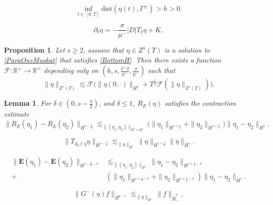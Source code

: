 \documentclass[10pt,a4paper]{amsart}
\newtheorem{proposition}{Proposition}
\newtheorem{lemma}{Lemma}
\newcommand{\R}{\mathbb{R}}
\newcommand{\f}{\frac}
\newcommand{\p}{\partial}
\begin{document}
\begin{equation} \label{BottomH}
 \inf_{t\in[0,T]}\text{dist}(\eta(t), \Gamma^\pm)> h>0.
\end{equation}

\begin{equation} \label{ParaOneMuskat}
 \p_t \eta = -\frac{\sigma}{\mu^{-}} |D|T_\ell \eta + K, 
\end{equation}

\begin{proposition} \label{t:OnePhaseEst}
Let $s\geq2$, assume that $\eta \in Z^s(T)$ is a solution to \eqref{ParaOneMuskat} that satisfies \eqref{BottomH}.
Then there exists a function $\mathcal{F}: \R^+ \rightarrow \R^+$ depending only on $(h,s,\frac{\rho^- g}{\mu^-},\frac{\sigma}{\mu^-})$ such that
\begin{equation} \label{OneAprioriEst}
  \| \eta\|_{Z^s(T)} \lesssim \mathcal{F}\big(\|\eta(0,\cdot)\|_{H^s} + T^\f12\mathcal{F}( \| \eta\|_{Z^s(T)})\big).
\end{equation}
\end{proposition}

\begin{lemma} \label{t:REEst}
For $\delta\in (0,s- \f32)$, and $\delta \leq 1$, $R_E(\eta)$ satisfies the contraction estimate
\begin{equation*}
 \|R_E(\eta_1) - R_E(\eta_2) \|_{H^{s-\f32}} \lesssim_{\|(\eta_1, \eta_2)\|_{H^s \times H^s}}  \Big(\|\eta_1\|_{H^{s+\f52}}+ \|\eta_2\|_{H^{s+\f52}} \Big) \| \eta_1 -\eta_2\|_{H^s}.
\end{equation*}
\end{lemma}

\begin{equation} \label{tdEtaEllEtaEta}
\|T_{d_{\eta}\ell\dot{\eta}}\eta\|_{H^{s-\f32}}\lesssim_{\|\eta\|_{H^s}} \|\eta\|_{H^{s+\f52}} \| \dot{\eta}\|_{H^s}.
\end{equation}

\begin{equation} \label{ElasticDiff}
\begin{aligned}
 \|\mathbf{E}(\eta_1) - \mathbf{E}(\eta_2) \|_{H^{s-\f32-\delta}} &\lesssim_{\|(\eta_1,\eta_2)\|_{H^s}}\|\eta_1 - \eta_2\|_{H^{s+\f52-\delta}}\\
 +&(\|\eta_1\|_{H^{s+\f52-\delta}}+\|\eta_2\|_{H^{s+\f52-\delta}})\|\eta_1 - \eta_2\|_{H^{s}}.
 \end{aligned}
\end{equation}

\begin{equation} \label{GfEtaf}
 \|G^-(\eta)f \|_{H^{\mathfrak{s} -1}} \lesssim_{\|\eta\|_{H^s}}  \|f\|_{ \widetilde{H}^\mathfrak{s}_-},
\end{equation}
\end{document}
